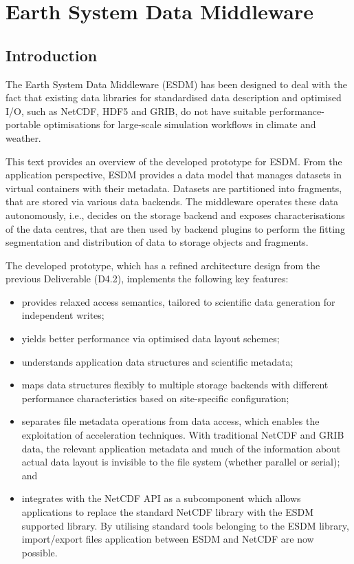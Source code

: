 \chapter{Earth System Data Middleware}

\section{Introduction}

\tab
The Earth System Data Middleware (ESDM) has been designed to deal with the fact that existing data libraries for standardised data description and optimised I/O, such as NetCDF, HDF5 and GRIB, do not have suitable performance-portable optimisations for large-scale simulation workflows in climate and weather.

This text provides an overview of the developed prototype for ESDM. From the application perspective, ESDM provides a data model that manages datasets in virtual containers with their metadata. Datasets are partitioned into fragments, that are stored via various data backends. The middleware operates these data autonomously, i.e., decides on the storage backend and exposes characterisations of the data centres, that are then used by backend plugins to perform the fitting segmentation and distribution of data to storage objects and fragments.

The developed prototype, which has a refined architecture design from the previous Deliverable (D4.2), implements the following key features:

\begin{itemize}

\item provides relaxed access semantics, tailored to scientific data generation for independent writes;

\item yields better performance via optimised data layout schemes;

\item understands application data structures and scientific metadata;

\item maps data structures flexibly to multiple storage backends with different performance characteristics based on site-specific configuration;

\item separates file metadata operations from data access, which enables the exploitation of acceleration techniques. With traditional NetCDF and GRIB data, the relevant application metadata and much of the information about actual data layout is invisible to the file system (whether parallel or serial); and

\item integrates with the NetCDF API as a subcomponent which allows applications to replace the standard NetCDF library with the ESDM supported library. By utilising standard tools belonging to the ESDM library, import/export files application between ESDM and NetCDF are now possible.

\end{itemize}

